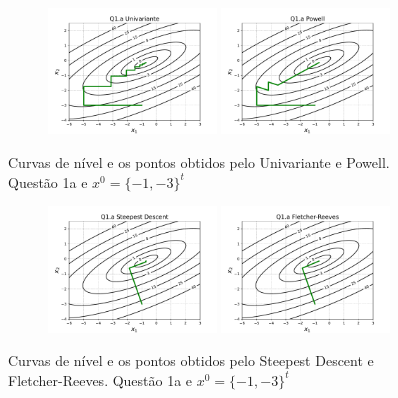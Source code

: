 \documentclass[10pt, a4paper]{article}
\begin{document}
\begin{figure}[H]
  \centering
  \begin{subfigure}[b]{\textwidth}
    \includegraphics[width=0.49\textwidth]{figuras/Q1.a_Univariante_P0=[-1 -3].pdf}
    \includegraphics[width=0.49\textwidth]{figuras/Q1.a_Powell_P0=[-1 -3].pdf}
  \end{subfigure}
  \caption{Curvas de nível e os pontos obtidos pelo Univariante e Powell. Questão 1a e $x^0 = \{-1,-3\}^t$}
\end{figure}

\begin{figure}[H]
  \centering
  \begin{subfigure}[b]{\textwidth}
    \includegraphics[width=0.49\textwidth]{figuras/Q1.a_Steepest Descent_P0=[-1 -3].pdf}
    \includegraphics[width=0.49\textwidth]{figuras/Q1.a_Fletcher-Reeves_P0=[-1 -3].pdf}
  \end{subfigure}
  \caption{Curvas de nível e os pontos obtidos pelo Steepest Descent e Fletcher-Reeves. Questão 1a e $x^0 = \{-1,-3\}^t$}
\end{figure}
\end{document}
